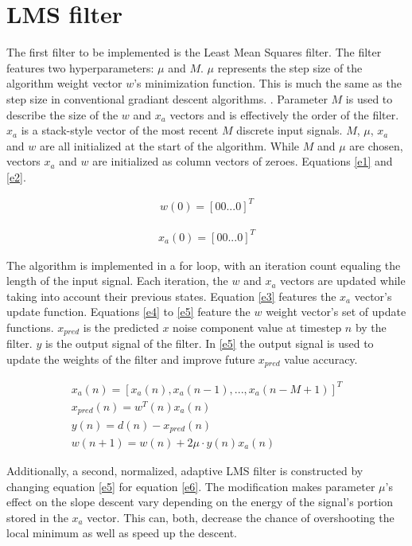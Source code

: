 \documentclass[10pt,a4paper,twocolumn]{article}
\begin{document}
\section*{LMS filter}

The first filter to be implemented is the Least Mean Squares filter. 
The filter features two hyperparameters: $\mu$ and $M$. $\mu$ represents the step size of the algorithm weight vector $w$'s minimization function. This is much the same as the step size in conventional gradiant descent algorithms. \cite{zhang2004solving}. Parameter $M$ is used to describe the size of the $w$ and $x_a$ vectors and is effectively the order of the filter. $x_a$ is a stack-style vector of the most recent $M$ discrete input signals. $M$, $\mu$, $x_a$ and $w$ are all initialized at the start of the algorithm. While $M$ and $\mu$ are chosen, vectors $x_a$ and $w$ are initialized as column vectors of zeroes. Equations \ref{e1} and \ref{e2}.

\begin{eqnarray}
\label{e1}
w(0) = [0 0 ... 0]^T
\end{eqnarray}

\begin{eqnarray}
\label{e2}
x_a(0) = [0 0 ... 0]^T
\end{eqnarray}


The algorithm is implemented in a for loop, with an iteration count equaling the length of the input signal. Each iteration, the $w$ and $x_a$ vectors are updated while taking into account their previous states. Equation \ref{e3} features the $x_a$ vector's update function. Equations \ref{e4} to \ref{e5} feature the $w$ weight vector's set of update functions. $x_{pred}$ is the predicted $x$ noise component value at timestep $n$ by the filter. $y$ is the output signal of the filter. In \ref{e5} the output signal is used to update the weights of the filter and improve future $x_{pred}$ value accuracy.



\begin{eqnarray}
\label{e3}
x_a(n) = [x_a(n), x_a(n-1),...,x_a(n-M+1)]^T \\
\label{e4}
x_{pred}(n) = w^T(n)x_a(n) \\
y(n) = d(n) - x_{pred}(n) \\
w(n+1) = w(n) + 2\mu \cdot y(n)x_a(n)
\label{e5}
\end{eqnarray}


Additionally, a second, normalized, adaptive LMS filter is constructed by changing equation \ref{e5} for equation \ref{e6}. The modification makes parameter $\mu$'s effect on the slope descent vary depending on the energy of the signal's portion stored in the $x_a$ vector. This can, both, decrease the chance of overshooting the local minimum as well as speed up the descent.
\end{document}
